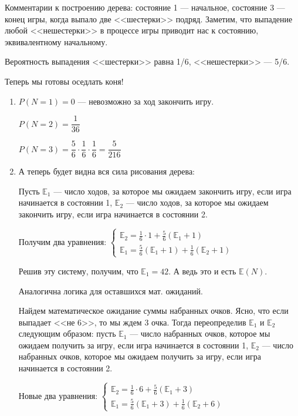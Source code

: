 \documentclass[a4paper,12pt]{article}
\theoremstyle{plain}                         %
\theoremstyle{definition}                  %
\theoremstyle{remark}                      %
\begin{document}
Комментарии к построению дерева: состояние 1 --- начальное, состояние 3 --- конец игры, когда выпало две <<шестерки>> подряд. Заметим, что выпадение любой <<нешестерки>> в процессе игры приводит нас к состоянию, эквивалентному начальному. 

Вероятность выпадения <<шестерки>> равна 1/6, <<нешестерки>> --- 5/6.

Теперь мы готовы оседлать коня!

\begin{enumerate}
\item $P(N = 1) = 0$ --- невозможно за ход закончить игру.

$P(N = 2) = \dfrac{1}{36}$

$P(N = 3) = \dfrac{5}{6} \cdot \dfrac{1}{6} \cdot \dfrac{1}{6} = \dfrac{5}{216}$

\item А теперь будет видна вся сила рисования дерева:

Пусть $\mathbb{E}_1$ --- число ходов, за которое мы ожидаем закончить игру, если игра начинается в состоянии 1, $\mathbb{E}_2$ --- число ходов, за которое мы ожидаем закончить игру, если игра начинается в состоянии 2. 

Получим два уравнения:
$\begin{cases} \mathbb{E}_2 = \frac{1}{6} \cdot 1 +  \frac{5}{6} (\mathbb{E}_1 + 1)   \\ \mathbb{E}_1 =  \frac{5}{6} (\mathbb{E}_1 + 1) + \frac{1}{6} ( \mathbb{E}_2 + 1) \end{cases} $

Решив эту систему, получим, что $\mathbb{E}_1 = 42$. А ведь это и есть $\mathbb{E}(N)$.


Аналогична логика для оставшихся мат. ожиданий.

Найдем математическое ожидание суммы набранных очков. Ясно, что если выпадает <<не 6>>, то мы ждем 3 очка. Тогда переопределив $\mathbb{E}_1$ и $\mathbb{E}_2$ следующим образом: пусть $\mathbb{E}_1$ --- число набранных очков, которое мы ожидаем получить за игру, если игра начинается в состоянии 1, $\mathbb{E}_2$ --- число набранных очков, которое мы ожидаем получить за игру, если игра начинается в состоянии 2.

Новые два уравнения:
$\begin{cases} \mathbb{E}_2 = \frac{1}{6} \cdot 6 +  \frac{5}{6} (\mathbb{E}_1 + 3)   \\ \mathbb{E}_1 =  \frac{5}{6} (\mathbb{E}_1 + 3) + \frac{1}{6} ( \mathbb{E}_2 + 6) \end{cases} $


\end{enumerate}
\end{document}
